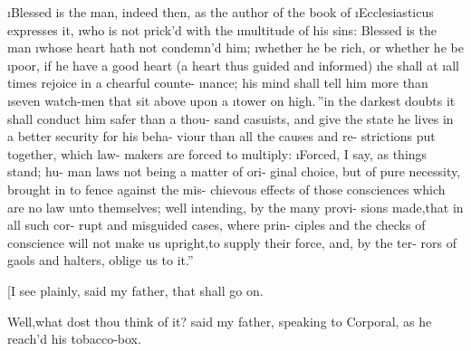 \documentclass[twoside]{article}
\begin{document}
\lqq \i{Blessed is the man}, indeed then, as\break
\lqq the author of the book of \i{Ecclesiasticus}\break
\lqq expresses it, \i{who is not prick’d with the}\break
\lqq \i{multitude of his sins: Blessed is the man}\break
\lqq \i{whose heart hath not condemn’d him};\break
\lqq \i{whether he be rich, or whether he be}\break
\lqq \i{poor, if he have a good heart} (a heart\break
\lqq thus guided and informed) \i{he shall at}\break
\lqq \i{all times rejoice in a chearful counte-}\break
\lqq \i{nance; his mind shall tell him more than}
\lqq \i{seven watch-men that sit above upon a}\break
\lqq \i{tower on high}.\,” \lqq in the darkest doubts\break
\lqq it shall conduct him safer than a thou-\break
\lqq sand casuists, and give the state he\break
\lqq lives in a better security for his beha-\break
\lqq viour than all the causes and re-\break
\lqq strictions put together, which law-\break
\lqq makers are forced to multiply:\tsh\break
\lqq \i{Forced}, I say, as things stand; hu-\break
\lqq man laws not being a matter of ori-\break
\lqq ginal choice, but of pure necessity,\break
\lqq brought in to fence against the mis-\break
\lqq chievous effects of those consciences\break
\lqq which are no law unto themselves;\break
\lqq well intending, by the many provi-\break
\lqq sions made,\tsh that in all such cor-\break
\lqq rupt and misguided cases, where prin-\break
\lqq ciples and the checks of conscience\break
\lqq will not make us upright,\tsh to
\lqq supply their force, and, by the ter-\break
\lqq rors of gaols and halters, oblige us\break
\lqq to it.”

[I see plainly, said my father, that\break
{}
\trim shall go on.

Well,\tsk what dost thou think of it? said my father,
speaking to Corporal\break \trim, as he reach’d his
tobacco-box.
\end{document}
